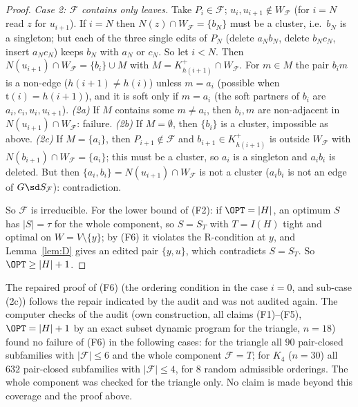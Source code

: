 \begin{proof}
\emph{Case 2: $\mathcal F$ contains only leaves.} Take $P_i\in\mathcal F$; $u_i,u_{i+1}\notin W_{\mathcal F}$ (for $i=N$ read $z$ for $u_{i+1}$). If $i=N$ then $N(z)\cap W_{\mathcal F}=\{b_N\}$ must be a cluster, i.e.\ $b_N$ is a singleton; but each of the three single edits of $P_N$ (delete $a_Nb_N$, delete $b_Nc_N$, insert $a_Nc_N$) keeps $b_N$ with $a_N$ or $c_N$. So let $i<N$. Then $N(u_{i+1})\cap W_{\mathcal F}=\{b_i\}\cup M$ with $M=K^+_{h(i+1)}\cap W_{\mathcal F}$. For $m\in M$ the pair $b_im$ is a non-edge ($h(i+1)\ne h(i)$) unless $m=a_i$ (possible when $\mathrm t(i)=h(i+1)$), and it is soft only if $m=a_i$ (the soft partners of $b_i$ are $a_i,c_i,u_i,u_{i+1}$). \emph{(2a)} If $M$ contains some $m\ne a_i$, then $b_i,m$ are non-adjacent in $N(u_{i+1})\cap W_{\mathcal F}$: failure. \emph{(2b)} If $M=\emptyset$, then $\{b_i\}$ is a cluster, impossible as above. \emph{(2c)} If $M=\{a_i\}$, then $P_{i+1}\notin\mathcal F$ and $b_{i+1}\in K^+_{h(i+1)}$ is outside $W_{\mathcal F}$ with $N(b_{i+1})\cap W_{\mathcal F}=\{a_i\}$; this must be a cluster, so $a_i$ is a singleton and $a_ib_i$ is deleted. But then $\{a_i,b_i\}=N(u_{i+1})\cap W_{\mathcal F}$ is not a cluster ($a_ib_i$ is not an edge of $G\sd S_{\mathcal F}$): contradiction.

So $\mathcal F$ is irreducible. For the lower bound of (F2): if $\OPT=|H|$, an optimum $S$ has $|S|=\tau$ for the whole component, so $S=S_T$ with $T=I(H)$ tight and optimal on $W=V\setminus\{y\}$; by (F6) it violates the R-condition at $y$, and Lemma~\ref{lem:D} gives an edited pair $\{y,u\}$, which contradicts $S=S_T$. So $\OPT\ge|H|+1$.
\end{proof}
\begin{remark}\label{rem:fivecov}
The repaired proof of (F6) (the ordering condition in the case $i=0$, and sub-case (2c)) follows the repair indicated by the audit and was not audited again. The computer checks of the audit (own construction, all claims (F1)--(F5), $\OPT=|H|+1$ by an exact subset dynamic program for the triangle, $n=18$) found no failure of (F6) in the following cases: for the triangle all $90$ pair-closed subfamilies with $|\mathcal F|\le6$ and the whole component $\mathcal F=T$; for $K_4$ ($n=30$) all $632$ pair-closed subfamilies with $|\mathcal F|\le4$, for $8$ random admissible orderings. The whole component was checked for the triangle only. No claim is made beyond this coverage and the proof above.
\end{remark}

